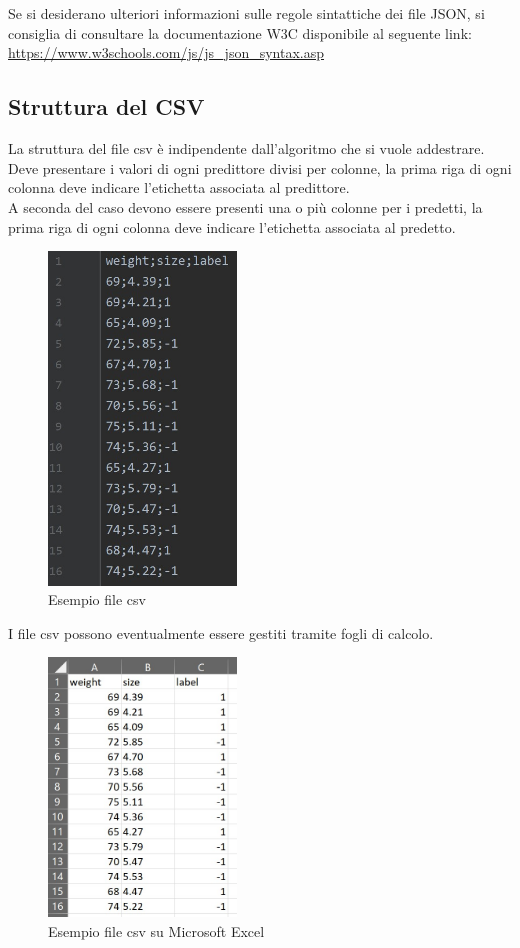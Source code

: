 		\mbox{} \\ \\ 
		Se si desiderano ulteriori informazioni sulle regole sintattiche dei file JSON, si consiglia di consultare la documentazione W3C disponibile al seguente link:
		\\[0.2cm]
		\hspace*{10mm}
		\url{https://www.w3schools.com/js/js_json_syntax.asp}
		
	\subsection{Struttura del CSV}
	La struttura del file csv è indipendente dall'algoritmo che si vuole addestrare.
	Deve presentare i valori di ogni predittore divisi per colonne, la prima riga di ogni colonna deve indicare l'etichetta associata al predittore. \\
	A seconda del caso devono essere presenti una o più colonne per i predetti, la prima riga di ogni colonna deve indicare l'etichetta associata al predetto.
	\mbox{}
	\begin{figure} [H]
		\begin{center}
			\includegraphics[width=50mm]{./img/csv1.jpg}
		\end{center}
		\caption{Esempio file csv}
	\end{figure}
	\mbox{}
	I file csv possono eventualmente essere gestiti tramite fogli di calcolo.
	\mbox{}
	\begin{figure} [H]
		\begin{center}
			\includegraphics[width=50mm]{./img/csv2.jpg}
		\end{center}
		\caption{Esempio file csv su Microsoft Excel}
	\end{figure}
	\mbox{} 